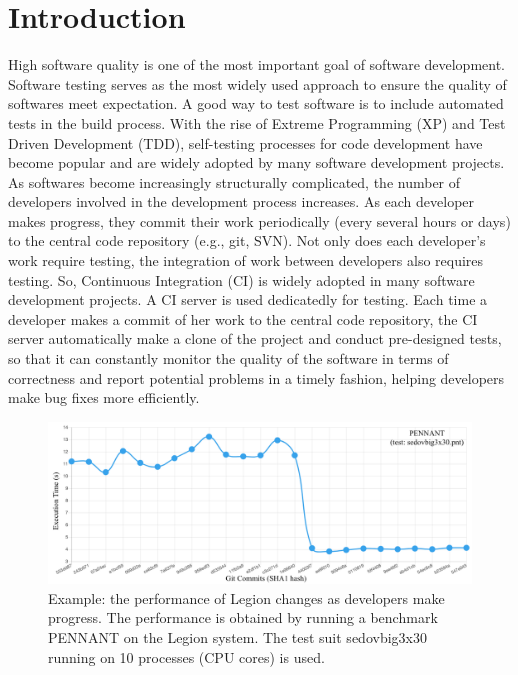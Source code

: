 \section{Introduction}
High software quality is one of the most important goal of software development. Software testing serves as the most widely used approach to ensure the quality of softwares meet expectation.
A good way to test software is to include automated tests in the build process.  With the rise of Extreme Programming (XP) and Test Driven Development (TDD), self-testing processes for code development have become popular and are widely adopted by many software development projects. 
As softwares become increasingly structurally complicated, the number of developers involved in the development process increases. As each developer makes progress, they commit their work periodically (every several hours or days) to the central code repository (e.g., git, SVN). Not only does each developer's work require testing, the integration of work between developers also requires testing. So, Continuous Integration (CI) \cite{fowler2006continuous} is widely adopted in many software development projects. A CI server is used dedicatedly for testing. Each time a developer makes a commit of her work to the central code repository, the CI server automatically make a clone of the project and conduct pre-designed tests, so that it can constantly monitor the quality of the software in terms of correctness and report potential problems in a timely fashion, helping developers make bug fixes more efficiently.  %

\begin{figure}[h]
    \centering
    \includegraphics[width=1\textwidth]{figures/CI-motivation-2.png}
    \caption{Example: the performance of Legion \cite{bauer2012legion} changes as developers make progress. The performance is obtained by running a benchmark PENNANT\cite{ferenbaugh2015pennant} on the Legion system. The test suit sedovbig3x30 running on 10 processes (CPU cores) is used. 
}
    \label{exp}
\end{figure}


